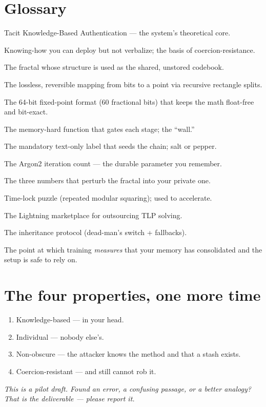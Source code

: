 \documentclass[a4paper,11pt]{report}
\begin{document}
\section{Glossary}
\begin{description}[leftmargin=0pt,style=nextline,nosep]
\item[TKBA] Tacit Knowledge-Based Authentication — the system's theoretical core.
\item[Tacit knowledge] Knowing-how you can deploy but not verbalize; the basis of
coercion-resistance.
\item[Burning Ship] The fractal whose structure is used as the shared, unstored
codebook.
\item[Bisection bijection] The lossless, reversible mapping from bits to a point
via recursive rectangle splits.
\item[I4F60] The 64-bit fixed-point format (60 fractional bits) that keeps the
math float-free and bit-exact.
\item[Argon2] The memory-hard function that gates each stage; the ``wall.''
\item[Stage 0] The mandatory text-only label that seeds the chain; salt or pepper.
\item[$N$] The Argon2 iteration count — the durable parameter you remember.
\item[$(o,p,q)$] The three numbers that perturb the fractal into your private one.
\item[TLP / RSW] Time-lock puzzle (repeated modular squaring); used to accelerate.
\item[jade-clock] The Lightning marketplace for outsourcing TLP solving.
\item[phoenix-scroll] The inheritance protocol (dead-man's switch + fallbacks).
\item[Graduation gate] The point at which training \emph{measures} that your
memory has consolidated and the setup is safe to rely on.
\end{description}

\section{The four properties, one more time}
\begin{enumerate}[leftmargin=1.6em,nosep]
\item Knowledge-based — in your head.
\item Individual — nobody else's.
\item Non-obscure — the attacker knows the method and that a stash exists.
\item Coercion-resistant — and still cannot rob it.
\end{enumerate}

\vfill
\begin{center}\small\itshape\color{graytext}
This is a pilot draft. Found an error, a confusing passage, or a better
analogy? That is the deliverable — please report it.
\end{center}
\end{document}
